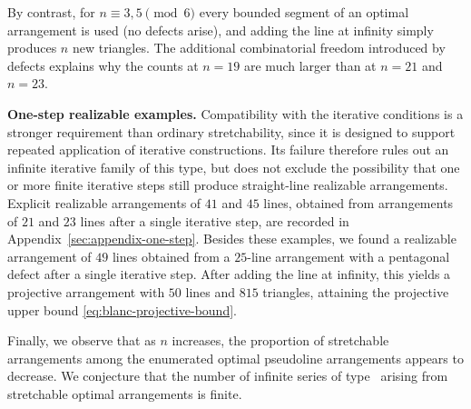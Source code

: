 By contrast, for $n\equiv 3,5\pmod{6}$ every bounded segment of an
optimal arrangement is used (no defects arise), and adding the line at
infinity simply produces $n$ new triangles. The additional combinatorial freedom introduced by
defects explains why the counts at $n=19$ are much larger than at
$n=21$ and $n=23$.

\textbf{One-step realizable examples.}
Compatibility with the iterative conditions is a stronger requirement than
ordinary stretchability, since it is designed to support repeated application
of iterative constructions. Its failure therefore rules out an infinite
iterative family of this type, but does not exclude the possibility that one
or more finite iterative steps still produce straight-line realizable
arrangements. Explicit realizable arrangements of
$41$ and $45$ lines, obtained from arrangements of $21$ and $23$ lines after a
single iterative step, are recorded in Appendix~\ref{sec:appendix-one-step}.
Besides these examples, we found a realizable arrangement
of $49$ lines obtained from a $25$-line arrangement with a pentagonal defect
after a single iterative step. After adding the line at infinity, this yields
a projective arrangement with $50$ lines and $815$ triangles, attaining the
projective upper bound \eqref{eq:blanc-projective-bound}.

Finally, we observe that as $n$ increases, the proportion of stretchable
arrangements among the enumerated optimal pseudoline arrangements appears to
decrease. We conjecture that the number of infinite series of
type~\cite{forge1998,bartholdi2007} arising from stretchable
optimal arrangements is finite.
